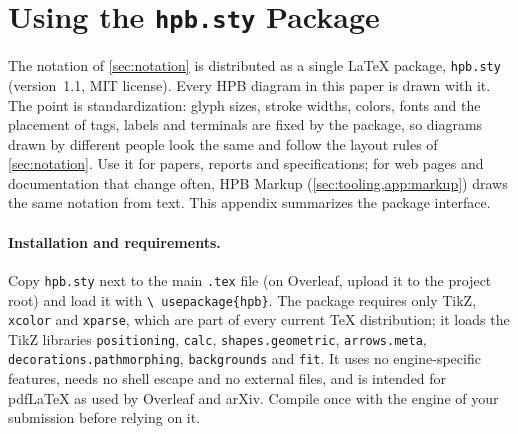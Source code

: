 \section{Using the \texttt{hpb.sty} Package}
\label{app:package}

The notation of \cref{sec:notation} is distributed as a single \LaTeX{}
package, \texttt{hpb.sty} (version~1.1, MIT license). Every HPB diagram in
this paper is drawn with it. The point is standardization: glyph sizes,
stroke widths, colors, fonts and the placement of tags, labels and terminals
are fixed by the package, so diagrams drawn by different people look the
same and follow the layout rules of \cref{sec:notation}. Use it for papers,
reports and specifications; for web pages and documentation that change
often, HPB Markup (\cref{sec:tooling,app:markup}) draws the same notation
from text. This appendix summarizes the package interface.

\paragraph{Installation and requirements.}
Copy \texttt{hpb.sty} next to the main \texttt{.tex} file (on Overleaf,
upload it to the project root) and load it with \texttt{\textbackslash
usepackage\{hpb\}}. The package requires only TikZ, \texttt{xcolor} and
\texttt{xparse}, which are part of every current \TeX{} distribution; it
loads the TikZ libraries \texttt{positioning}, \texttt{calc},
\texttt{shapes.geometric}, \texttt{arrows.meta},
\texttt{decorations.pathmorphing}, \texttt{backgrounds} and \texttt{fit}.
It uses no engine-specific features, needs no shell escape and no external
files, and is intended for pdf\LaTeX{} as used by Overleaf and arXiv.
Compile once with the engine of your submission before relying on it.

